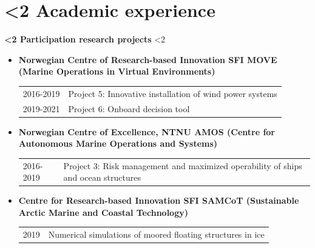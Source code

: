 \documentclass[10pt]{ctexart}
\begin{document}
\section*{\textbf{\ifnum\value{num}<2 {Academic experience}  \fi}}
\textbf{\ifnum\value{num}<2 {Participation research projects}  \fi}
\ifnum\value{num}<2 {
    \begin{itemize}[label={}] \setlength\itemsep{0.5em}
    \item \textbf{Norwegian Centre of Research-based Innovation SFI MOVE (Marine Operations in Virtual Environments)}\\
        \begin{tabular}[t]{R{0.15\columnwidth}L{0.8\columnwidth}}
        2016-2019 &  Project 5: Innovative installation of wind power systems\\
        2019-2021 &  Project 6: Onboard decision tool\\
        \end{tabular}%
    \item \textbf{Norwegian Centre of Excellence, NTNU AMOS (Centre for Autonomous Marine Operations and Systems)}
    \begin{tabular}[t]{R{0.15\columnwidth}L{0.8\columnwidth}}
        2016-2019 &  Project 3: Risk management and maximized operability of ships and ocean structures \\
    \end{tabular}%
    \item \textbf{Centre for Research-based Innovation SFI SAMCoT (Sustainable Arctic Marine and Coastal Technology)}\\
    \begin{tabular}[t]{R{0.15\columnwidth}L{0.8\columnwidth}}
        2019 &  Numerical simulations of moored floating structures in ice\\
    \end{tabular}%
    \end{itemize}
}\fi
\vspace*{0.5em}
\end{document}
